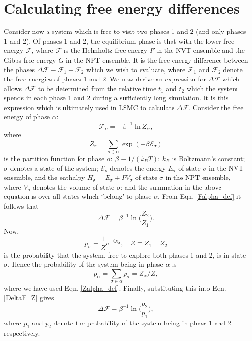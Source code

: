 \documentclass{report}
\begin{document}
\section{Calculating free energy differences}
Consider now a system which is free to visit two phases 1 and 2 (and only phases 1 and 2).
Of phases 1 and 2, the equilibrium phase is that with the lower free energy $\mathcal{F}$, where $\mathcal{F}$ is the Helmholtz free energy $F$ in the 
NVT ensemble and the Gibbs free energy $G$ in the NPT ensemble. It is the free energy difference between the phases 
$\Delta\mathcal{F}\equiv \mathcal{F}_1-\mathcal{F}_2$ which we wish to evaluate, where $\mathcal{F}_1$ and $\mathcal{F}_2$ denote the free energies of 
phases 1 and 2.
We now derive an expression for $\Delta \mathcal{F}$ which allows $\Delta \mathcal{F}$ to be determined from the relative time $t_1$ and $t_2$ which 
the system spends in each phase 1 and 2 during a sufficiently long simulation. It is this expression which is ultimately used in LSMC to calculate 
$\Delta \mathcal{F}$. Consider the free energy of phase $\alpha$:
\begin{equation}\label{Falpha_def}
\mathcal{F}_{\alpha}=-\beta^{-1}\ln Z_{\alpha},
\end{equation}
where
\begin{equation}\label{Zalpha_def}
Z_{\alpha}=\sum_{\sigma\in\alpha}\exp(-\beta \mathcal{E}_{\sigma})
\end{equation}
is the partition function for phase $\alpha$; $\beta\equiv 1/(k_BT)$; $k_B$ is Boltzmann's constant; $\sigma$ denotes a state of the system;
$\mathcal{E}_{\sigma}$ denotes the energy $E_{\sigma}$ of state $\sigma$ in the NVT ensemble, and the enthalpy $H_{\sigma}=E_{\sigma}+PV_{\sigma}$ of
state $\sigma$ in the NPT ensemble, where $V_{\sigma}$ denotes the volume of state $\sigma$; 
and the summation in the above equation is over all states which `belong' to phase $\alpha$. 
From Eqn. \eqref{Falpha_def} it follows that
\begin{equation}\label{DeltaF_Z}
\Delta \mathcal{F}=\beta^{-1}\ln\biggl(\frac{Z_2}{Z_1}\biggr).
\end{equation}
Now,
\begin{equation}\label{MC_prob}
p_{\sigma}=\frac{1}{Z}e^{-\beta \mathcal{E}_{\sigma}}, \quad Z\equiv Z_1+Z_2
\end{equation}
is the probability that the system, free to explore both phases 1 and 2, is in state $\sigma$. Hence the probability of the system being in
phase $\alpha$ is
\begin{equation}
p_{\alpha} = \sum_{\sigma\in \alpha}p_{\sigma} = Z_{\alpha}/Z,
\end{equation}
where we have used Eqn. \eqref{Zalpha_def}. Finally, substituting this into Eqn. \eqref{DeltaF_Z} gives
\begin{equation}\label{DeltaF_stat_mech}
\Delta \mathcal{F}=\beta^{-1}\ln\biggl(\frac{p_2}{p_1}\biggr),
\end{equation}
where $p_1$ and $p_2$ denote the probability of the system being in phase 1 and 2 respectively. 
\end{document}

